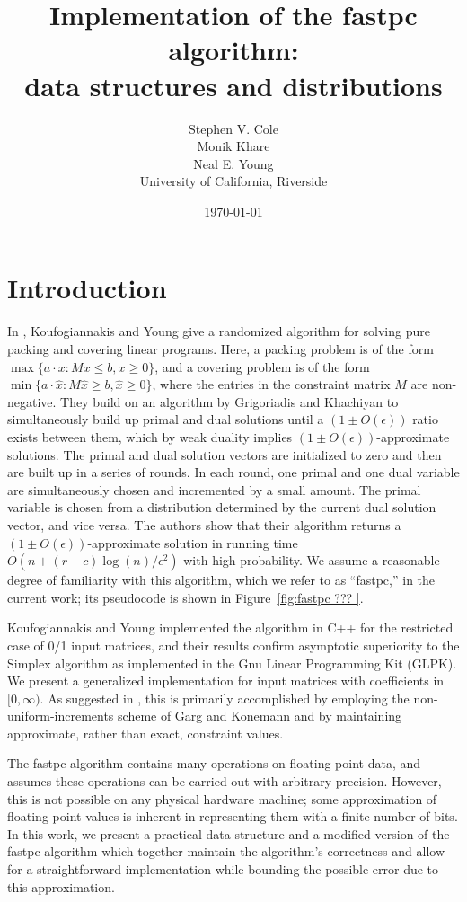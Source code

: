 \documentclass[11pt]{article}
\title{Implementation of the fastpc algorithm: 
  \\data structures and distributions}
\author{Stephen V. Cole 
\\ Monik Khare
\\ Neal E. Young
\\ \normalsize{University of California, Riverside} 
}
\date{\today}
\newcommand{\xhat}{\hat{x}}
\newcommand{\runtime}{O(n + (r + c)\log (n) / \epsilon^2)}
\begin{document}
\maketitle


\section{Introduction} \label{sec:introduction}
In \cite{kouf2007}, Koufogiannakis and Young give a randomized algorithm for 
solving pure packing and covering linear programs.  Here, a packing problem is 
of the form $\max\{a \cdot x : Mx \le b, x \ge 0\}$, and a covering problem is 
of the form $\min\{a \cdot \xhat : M \xhat \ge b, \xhat \ge 0\}$, where
the entries in the constraint matrix $M$ are non-negative.  
They build on an algorithm by 
Grigoriadis and Khachiyan \cite{grigoriadis1995} to simultaneously build up 
primal 
and dual solutions until a $(1 \pm O(\epsilon))$ ratio exists between them, 
which by weak duality implies $(1 \pm O(\epsilon))$-approximate solutions. 
The primal 
and dual solution vectors are initialized to zero and then are built up in a 
series of rounds. In each round, one primal and one dual variable are 
simultaneously chosen and incremented by a small amount. 
The primal variable is chosen from a distribution determined by the current 
dual solution vector, and vice versa.
The authors show that their algorithm returns a 
$(1 \pm O(\epsilon))$-approximate solution in running time $\runtime$ 
 with high probability.  We assume a reasonable degree of familiarity with this
 algorithm, which we refer to as ``fastpc,'' in the current work; its pseudocode is shown in Figure~\ref{fig:fastpc ???  }.

Koufogiannakis and Young 
implemented the algorithm in C++ for the restricted case of 0/1 
input matrices, and their results confirm asymptotic superiority to the 
Simplex algorithm as implemented in the Gnu Linear Programming Kit (GLPK).  
We present a generalized implementation for input matrices with coefficients 
in $[0, \infty)$.  As suggested in \cite{kouf2007}, this is primarily 
accomplished by employing the non-uniform-increments scheme of Garg and 
Konemann \cite{garg1998} and by maintaining approximate, rather than exact, 
constraint values. 

The fastpc algorithm contains many operations on floating-point data, and assumes these operations can be carried out with arbitrary precision.  However, this is not possible on any physical hardware machine; some approximation of floating-point values is inherent in representing them with a finite number of bits.
  In this work, we present  a practical data structure and a modified version of the fastpc algorithm which together maintain the  algorithm's correctness and allow for a straightforward implementation while bounding the possible error due to this approximation.  
\end{document}
